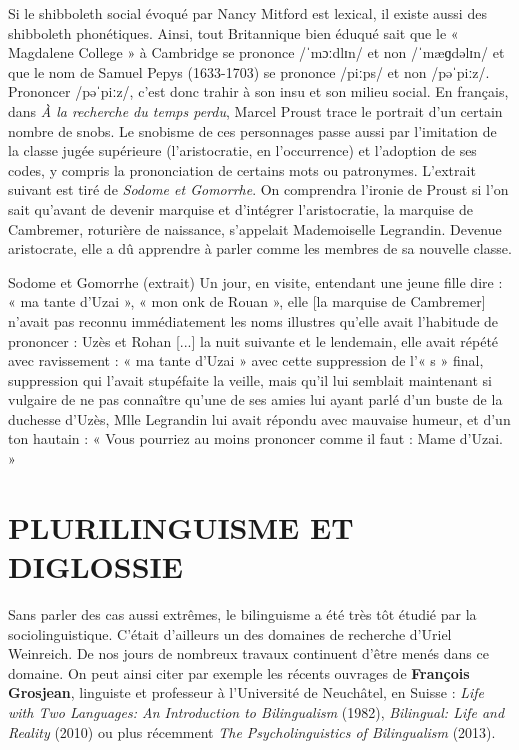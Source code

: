 Si le shibboleth social évoqué par Nancy Mitford est lexical, il existe aussi des shibboleth phonétiques. Ainsi, tout Britannique bien éduqué sait que le « Magdalene College » à Cambridge se prononce /ˈmɔːdlɪn/ et non /ˈmæɡdəlɪn/ et que le nom de Samuel Pepys (1633-1703) se prononce /piːps/ et non /pəˈpiːz/. Prononcer /pəˈpiːz/, c’est donc trahir à son insu et son milieu social. En français, dans \textit{À la recherche du temps perdu}, Marcel Proust trace le portrait d’un certain nombre de snobs. Le snobisme de ces personnages passe aussi par l’imitation de la classe jugée supérieure (l’aristocratie, en l’occurrence) et l’adoption de ses codes, y compris la prononciation de certains mots ou patronymes. L’extrait suivant est tiré de \textit{Sodome et Gomorrhe}. On comprendra l’ironie de Proust si l’on sait qu’avant de devenir marquise et d’intégrer l’aristocratie, la marquise de Cambremer, roturière de naissance, s’appelait Mademoiselle Legrandin. Devenue aristocrate, elle a dû apprendre à parler comme les membres de sa nouvelle classe.

\begin{lecture}{Sodome et Gomorrhe (extrait)}
Un jour, en visite, entendant une jeune fille dire : « ma tante d’Uzai », « mon onk de Rouan », elle [la marquise de Cambremer] n’avait pas reconnu immédiatement les noms illustres qu’elle avait l’habitude de prononcer : Uzès et Rohan [...] la nuit suivante et le lendemain, elle avait répété avec ravissement : « ma tante d’Uzai » avec cette suppression de l’« s » final, suppression qui l’avait stupéfaite la veille, mais qu’il lui semblait maintenant si vulgaire de ne pas connaître qu’une de ses amies lui ayant parlé d’un buste de la duchesse d’Uzès, Mlle Legrandin lui avait répondu avec mauvaise humeur, et d’un ton hautain : « Vous pourriez au moins prononcer comme il faut : Mame d’Uzai. »
\end{lecture}

\section{PLURILINGUISME ET DIGLOSSIE}
Sans parler des cas aussi extrêmes, le bilinguisme a été très tôt étudié par la sociolinguistique. C’était d’ailleurs un des domaines de recherche d’Uriel Weinreich. De nos jours de nombreux travaux continuent d’être menés dans ce domaine. On peut ainsi citer par exemple les récents ouvrages de \textbf{François Grosjean}, linguiste et professeur à l’Université de Neuchâtel, en Suisse : \textit{Life with Two Languages: An Introduction to Bilingualism} (1982), \textit{Bilingual: Life and Reality} (2010) ou plus récemment \textit{The Psycholinguistics of Bilingualism} (2013).

